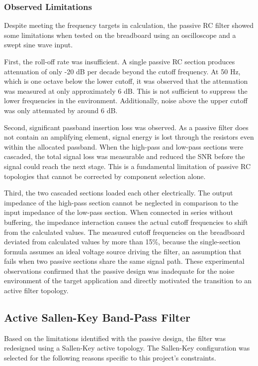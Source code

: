 \subsubsection{Observed Limitations}

Despite meeting the frequency targets in calculation, the passive RC filter showed some limitations when tested on the breadboard using an oscilloscope and a swept sine wave input.

First, the roll-off rate was insufficient. A single passive RC section produces attenuation of only -20 dB per decade beyond the cutoff frequency. At 50 Hz, which is one octave below the lower cutoff, it was observed that the attenuation was measured at only approximately 6 dB. This is not sufficient to suppress the lower frequencies in the environment. Additionally, noise above the upper cutoff was only attenuated by around 6 dB.

Second, significant passband insertion loss was observed. As a passive filter does not contain an amplifying element, signal energy is lost through the resistors even within the allocated passband. When the high-pass and low-pass sections were cascaded, the total signal loss was measurable and reduced the SNR before the signal could reach the next stage. This is a fundamental limitation of passive RC topologies that cannot be corrected by component selection alone.

Third, the two cascaded sections loaded each other electrically. The output impedance of the high-pass section cannot be neglected in comparison to the input impedance of the low-pass section. When connected in series without buffering, the impedance interaction causes the actual cutoff frequencies to shift from the calculated values. The measured cutoff frequencies on the breadboard deviated from calculated values by more than 15\%, because the single-section formula assumes an ideal voltage source driving the filter, an assumption that fails when two passive sections share the same signal path. These experimental observations confirmed that the passive design was inadequate for the noise environment of the target application and directly motivated the transition to an active filter topology.


\subsection{Active Sallen-Key Band-Pass Filter}

Based on the limitations identified with the passive design, the filter was redesigned using a Sallen-Key active topology. The Sallen-Key configuration was selected for the following reasons specific to this project's constraints.

